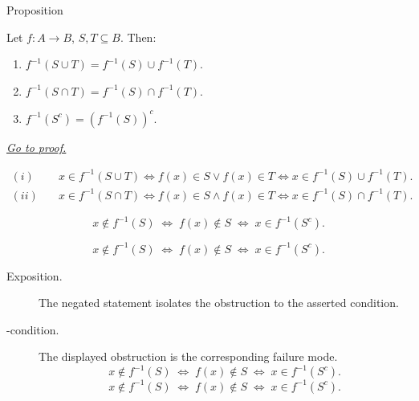 \begin{propositionbox}{Proposition}
\begin{proposition}
\label{prop:preimage-union-intersection}
Let $f:A\to B$, $S,T\subseteq B$. Then:
\begin{enumerate}[label=(\roman*)]
  \item $f^{-1}(S\cup T)=f^{-1}(S)\cup f^{-1}(T)$.
  \item $f^{-1}(S\cap T)=f^{-1}(S)\cap f^{-1}(T)$.
  \item $f^{-1}(S^c)=(f^{-1}(S))^c$.
\end{enumerate}

\smallskip\noindent
\hyperref[prf:preimage-union-intersection]{\textit{Go to proof.}}
\end{proposition}
\end{propositionbox}

\begin{remark*}
\[
\begin{aligned}
(i)\quad &x\in f^{-1}(S\cup T)\iff f(x)\in S\vee f(x)\in T
         \iff x\in f^{-1}(S)\cup f^{-1}(T). \\
(ii)\quad &x\in f^{-1}(S\cap T)\iff f(x)\in S\wedge f(x)\in T
          \iff x\in f^{-1}(S)\cap f^{-1}(T).
\end{aligned}
\]
\end{remark*}

\begin{remark*}
\[
  x\notin f^{-1}(S)
  \;\iff\; f(x)\notin S
  \;\iff\; x\in f^{-1}(S^c).
\]
\end{remark*}

\begin{remark*}
\[
  x\notin f^{-1}(S)
  \;\iff\; f(x)\notin S
  \;\iff\; x\in f^{-1}(S^c).
\]
\end{remark*}

\begin{remark*}
\begin{description}
  \item[Exposition.]
  The negated statement isolates the obstruction to the asserted condition.

  \item[\exists-condition.]
  The displayed obstruction is the corresponding failure mode.
  \[
  x\notin f^{-1}(S)
  \;\iff\; f(x)\notin S
  \;\iff\; x\in f^{-1}(S^c).
\]
  \[
  x\notin f^{-1}(S)
  \;\iff\; f(x)\notin S
  \;\iff\; x\in f^{-1}(S^c).
\]
\end{description}
\end{remark*}



